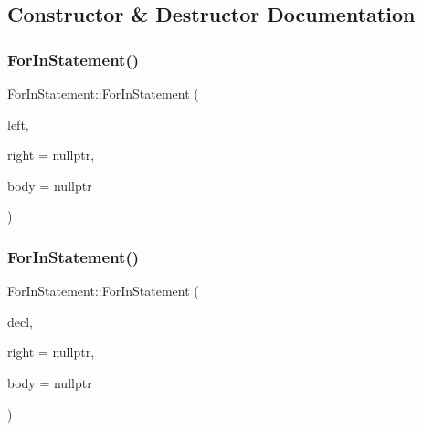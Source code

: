 \subsection{Constructor \& Destructor Documentation}
\mbox{\label{struct_for_in_statement_aa3565db4851cca290147f4d98b275c68}} 
\subsubsection{\texorpdfstring{For\+In\+Statement()}{ForInStatement()}\hspace{0.1cm}{\footnotesize\ttfamily [1/2]}}
{\footnotesize\ttfamily For\+In\+Statement\+::\+For\+In\+Statement (\begin{DoxyParamCaption}\item[{\hyperlink{struct_left_hand_side_expression}{Left\+Hand\+Side\+Expression} $\ast$}]{left,  }\item[{\hyperlink{struct_expression}{Expression} $\ast$}]{right = {\ttfamily nullptr},  }\item[{\hyperlink{struct_statement}{Statement} $\ast$}]{body = {\ttfamily nullptr} }\end{DoxyParamCaption})\hspace{0.3cm}{\ttfamily [inline]}}

\mbox{\label{struct_for_in_statement_a3949dca565a177d23000804470272be6}} 
\subsubsection{\texorpdfstring{For\+In\+Statement()}{ForInStatement()}\hspace{0.1cm}{\footnotesize\ttfamily [2/2]}}
{\footnotesize\ttfamily For\+In\+Statement\+::\+For\+In\+Statement (\begin{DoxyParamCaption}\item[{\hyperlink{struct_variable_declaration}{Variable\+Declaration} $\ast$}]{decl,  }\item[{\hyperlink{struct_expression}{Expression} $\ast$}]{right = {\ttfamily nullptr},  }\item[{\hyperlink{struct_statement}{Statement} $\ast$}]{body = {\ttfamily nullptr} }\end{DoxyParamCaption})\hspace{0.3cm}{\ttfamily [inline]}}



